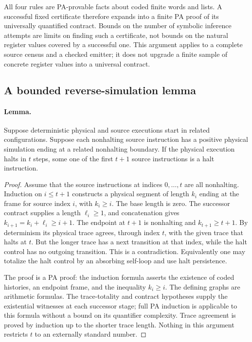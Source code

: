All four rules are PA-provable facts about coded finite words and lists.
A successful fixed certificate therefore expands into a finite PA proof
of its universally quantified contract.  Bounds on the number of
symbolic inference attempts are limits on finding such a certificate,
not bounds on the natural register values covered by a successful one.
This argument applies to a complete source census and a checked emitter;
it does not upgrade a finite sample of concrete register values into
a universal contract.

\subsection{A bounded reverse-simulation lemma}

\paragraph{Lemma.}
Suppose deterministic physical and source executions start in related
configurations.  Suppose each nonhalting source instruction has a positive
physical simulation ending at a related nonhalting boundary.  If the
physical execution halts in $t$ steps, some one of the first $t+1$ source
instructions is a halt instruction.

\begin{proof}
Assume that the source instructions at indices $0,\ldots,t$ are all
nonhalting.  Induction on $i\leq t+1$ constructs a physical segment
of length $k_i$ ending at the frame for source index $i$, with $k_i\geq i$.
The base length is zero.  The successor contract supplies a length
$\ell_i\geq1$, and concatenation gives $k_{i+1}=k_i+\ell_i\geq i+1$.
The endpoint at $t+1$ is nonhalting and $k_{t+1}\geq t+1$.
By determinism its physical trace agrees, through index $t$, with the
given trace that halts at $t$.  But the longer trace has a next transition
at that index, while the halt control has no outgoing transition.  This
is a contradiction.  Equivalently one may totalize the halt control by
an absorbing self-loop and use halt persistence.

The proof is a PA proof: the induction formula asserts the existence
of coded histories, an endpoint frame, and the inequality $k_i\geq i$.
The defining graphs are arithmetic formulas.  The trace-totality and
contract hypotheses supply the existential witnesses at each successor
stage; full PA induction is applicable to this formula without a bound
on its quantifier complexity.  Trace agreement is proved by induction
up to the shorter trace length.  Nothing in this argument restricts $t$
to an externally standard number.
\end{proof}

